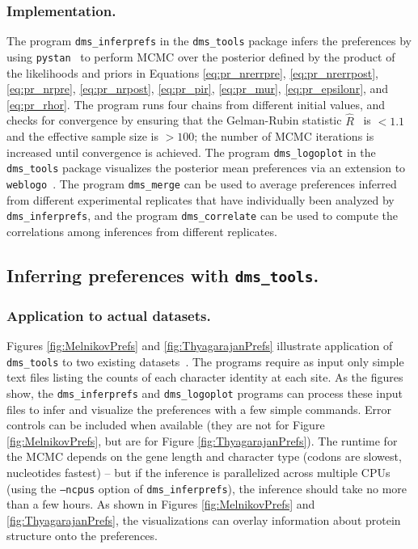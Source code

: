 \documentclass[twocolumn]{bmcart}%
\begin{document}
\subsubsection*{Implementation.}
The program \texttt{dms\_inferprefs} in the \texttt{dms\_tools} package infers the preferences by using \texttt{pystan}~\cite{pystan-software:2014} to perform MCMC over the posterior defined by the product of the likelihoods and priors in Equations \ref{eq:pr_nrerrpre}, \ref{eq:pr_nrerrpost}, \ref{eq:pr_nrpre}, \ref{eq:pr_nrpost}, \ref{eq:pr_pir}, \ref{eq:pr_mur}, \ref{eq:pr_epsilonr}, and \ref{eq:pr_rhor}. The program runs four chains from different initial values, and checks for convergence by ensuring that the Gelman-Rubin statistic $\hat{R}$~\cite{gelman1992inference} is $<1.1$ and the effective sample size is $>100$; the number of MCMC iterations is increased until convergence is achieved. The program \texttt{dms\_logoplot} in the \texttt{dms\_tools} package visualizes the posterior mean preferences via an extension to \texttt{weblogo}~\cite{crooks2004}. The program \texttt{dms\_merge} can be used to average preferences inferred from different experimental replicates that have individually been analyzed by \texttt{dms\_inferprefs}, and the program \texttt{dms\_correlate} can be used to compute the correlations among inferences from different replicates.

\subsection*{Inferring preferences with \texttt{dms\_tools}.}

\subsubsection*{Application to actual datasets.}
Figures \ref{fig:MelnikovPrefs} and \ref{fig:ThyagarajanPrefs} illustrate application of \texttt{dms\_tools} to two existing datasets~\cite{melnikov2014comprehensive,thyagarajan2014inherent}. The programs require as input only simple text files listing the counts of each character identity at each site. As the figures show, the \texttt{dms\_inferprefs} and \texttt{dms\_logoplot} programs can process these input files to infer and visualize the preferences with a few simple commands. Error controls can be included when available (they are not for Figure \ref{fig:MelnikovPrefs}, but are for Figure \ref{fig:ThyagarajanPrefs}). The runtime for the MCMC depends on the gene length and character type (codons are slowest, nucleotides fastest) -- but if the inference is parallelized across multiple CPUs (using the \texttt{--ncpus} option of \texttt{dms\_inferprefs}), the inference should take no more than a few hours. As shown in Figures \ref{fig:MelnikovPrefs} and \ref{fig:ThyagarajanPrefs}, the visualizations can overlay information about protein structure onto the preferences.
\end{document}
